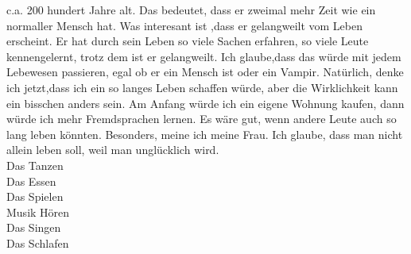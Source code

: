 \documentclass[a4paper,12pt]{article}
\begin{document}
c.a. 200 hundert Jahre alt. Das bedeutet, dass er zweimal mehr Zeit wie ein normaller Mensch hat. Was interesant ist ,dass er gelangweilt vom Leben erscheint.
Er hat durch sein Leben so viele Sachen erfahren, so viele Leute kennengelernt, trotz dem ist er gelangweilt. Ich glaube,dass das w\"urde mit jedem Lebewesen passieren, egal ob
er ein Mensch ist oder ein Vampir. Nat\"urlich, denke ich jetzt,dass ich ein so langes Leben schaffen w\"urde, aber die Wirklichkeit kann ein bisschen anders sein.
Am Anfang w\"urde ich ein eigene Wohnung kaufen, dann w\"urde ich mehr Fremdsprachen lernen. Es w\"are gut, wenn andere Leute auch so lang leben k\"onnten. Besonders, meine ich meine
Frau. Ich glaube, dass man nicht allein leben soll, weil man ungl\"ucklich wird.
\vspace{2pc}\\
Das Tanzen\\Das Essen\\Das Spielen\\Musik H\"oren\\Das Singen\\Das Schlafen
\end{document}
